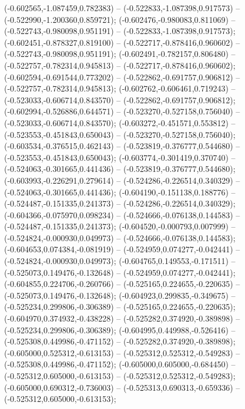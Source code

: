  (-0.602565,-1.087459,0.782383) -- (-0.522833,-1.087398,0.917573) -- (-0.522990,-1.200360,0.859721);
 (-0.602476,-0.980083,0.811069) -- (-0.522743,-0.980098,0.951191) -- (-0.522833,-1.087398,0.917573);
 (-0.602451,-0.878327,0.819100) -- (-0.522717,-0.878416,0.960602) -- (-0.522743,-0.980098,0.951191);
 (-0.602491,-0.782157,0.806480) -- (-0.522757,-0.782314,0.945813) -- (-0.522717,-0.878416,0.960602);
 (-0.602594,-0.691544,0.773202) -- (-0.522862,-0.691757,0.906812) -- (-0.522757,-0.782314,0.945813);
 (-0.602762,-0.606461,0.719243) -- (-0.523033,-0.606714,0.843570) -- (-0.522862,-0.691757,0.906812);
 (-0.602994,-0.526886,0.644571) -- (-0.523270,-0.527158,0.756040) -- (-0.523033,-0.606714,0.843570);
 (-0.603272,-0.451571,0.553812) -- (-0.523553,-0.451843,0.650043) -- (-0.523270,-0.527158,0.756040);
 (-0.603534,-0.376515,0.462143) -- (-0.523819,-0.376777,0.544680) -- (-0.523553,-0.451843,0.650043);
 (-0.603774,-0.301419,0.370740) -- (-0.524063,-0.301665,0.441436) -- (-0.523819,-0.376777,0.544680);
 (-0.603993,-0.226291,0.279614) -- (-0.524286,-0.226514,0.340329) -- (-0.524063,-0.301665,0.441436);
 (-0.604190,-0.151138,0.188776) -- (-0.524487,-0.151335,0.241373) -- (-0.524286,-0.226514,0.340329);
 (-0.604366,-0.075970,0.098234) -- (-0.524666,-0.076138,0.144583) -- (-0.524487,-0.151335,0.241373);
 (-0.604520,-0.000793,0.007999) -- (-0.524824,-0.000930,0.049973) -- (-0.524666,-0.076138,0.144583);
 (-0.604653,0.074384,-0.081919) -- (-0.524959,0.074277,-0.042441) -- (-0.524824,-0.000930,0.049973);
 (-0.604765,0.149553,-0.171511) -- (-0.525073,0.149476,-0.132648) -- (-0.524959,0.074277,-0.042441);
 (-0.604855,0.224706,-0.260766) -- (-0.525165,0.224655,-0.220635) -- (-0.525073,0.149476,-0.132648);
 (-0.604923,0.299835,-0.349675) -- (-0.525234,0.299806,-0.306389) -- (-0.525165,0.224655,-0.220635);
 (-0.604970,0.374932,-0.438228) -- (-0.525282,0.374920,-0.389898) -- (-0.525234,0.299806,-0.306389);
 (-0.604995,0.449988,-0.526416) -- (-0.525308,0.449986,-0.471152) -- (-0.525282,0.374920,-0.389898);
 (-0.605000,0.525312,-0.613153) -- (-0.525312,0.525312,-0.549283) -- (-0.525308,0.449986,-0.471152);
 (-0.605000,0.605000,-0.684450) -- (-0.525312,0.605000,-0.613153) -- (-0.525312,0.525312,-0.549283);
 (-0.605000,0.690312,-0.736003) -- (-0.525313,0.690313,-0.659336) -- (-0.525312,0.605000,-0.613153);
